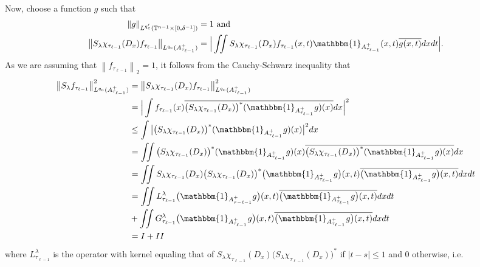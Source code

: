 \documentclass[11pt]{amsart}
\numberwithin{equation}{section}
\newcommand{\Tn}{\mathbb{T}^{n-1}}
\newcommand{\la}{\lambda}
\newcommand\norm[1]{\left\lVert#1\right\rVert}
\newcommand{\lpnorm}[3]{\norm{#1}_{L^{#2}(#3)}}
\newcommand{\lpn}[2]{\norm{#1}_{#2}}
\newcommand{\Sl}{S_{\la}}
\begin{document}
Now, choose a function $g$ such that
\begin{equation} \label{large height duality function}
\begin{split}
        \lpnorm{g}{q_c'}{\Tn \times [0, \delta^{-1}]} &= 1 \ \text{and} \\
        \lpnorm{\Sl \chi_{\tau_{\ell - 1}}(D_x)f_{\tau_{\ell - 1}}}{q_c}{A^{+}_{\tau_{\ell - 1}}} &= \Big|\iint \Sl \chi_{\tau_{\ell - 1}}(D_x) f_{\tau_{\ell - 1}}(x,t)\mathbbm{1}_{A^{+}_{\tau_{\ell - 1}}}(x,t)\overline{ g(x,t)} dx dt\Big|.
\end{split}
\end{equation}
As we are assuming that $\lpn{f_{\tau_{\ell - 1}}}{2} = 1$, it follows from the Cauchy-Schwarz inequality that
\begin{equation}
\begin{split}
\lpnorm{\Sl  f_{\tau_{\ell - 1}}}{q_c}{A^{+}_{\tau_{\ell - 1}}}^2 &= \lpnorm{\Sl \chi_{\tau_{\ell - 1}}(D_x) f_{\tau_{\ell - 1}}}{q_c}{A^{+}_{\tau_{\ell - 1}}}^2 \\ 
    &= \Big|\int f_{\tau_{\ell - 1}}(x)\overline{\big(\Sl \chi_{\tau_{\ell - 1}}(D_x)\big)^* (\mathbbm{1}_{A^{+}_{\tau_{\ell - 1}}}g)(x)} dx \Big|^2 \\
     &\leq \int \big|\big(\Sl \chi_{\tau_{\ell - 1}}(D_x)\big)^* (\mathbbm{1}_{A^{+}_{\tau_{\ell - 1}}}g)(x) \big|^2 dx \\
    &= \iint \big(\Sl \chi_{\tau_{\ell - 1}}(D_x)\big)^* (\mathbbm{1}_{A^{+}_{\tau_{\ell - 1}}}g)(x) \overline{\big(\Sl \chi_{\tau_{\ell - 1}}(D_x)\big)^* (\mathbbm{1}_{A^{+}_{\tau_{\ell - 1}}}g)(x)} dx \\
     &= \iint \Sl \chi_{\tau_{\ell -1}}(D_x) \big( \Sl \chi_{\tau_{\ell - 1}}(D_x)\big)^*\big( \mathbbm{1}_{A^{+}_{\tau_{\ell - 1}}}g\big)(x,t) \overline{\big( \mathbbm{1}_{A^{+}_{\tau_{\ell - 1}}}g\big)(x,t)}dxdt \\
    &=\iint L_{\tau_{\ell - 1}}^{\la}\big( \mathbbm{1}_{A^{+}_{\tau-{\ell - 1}}}g\big)(x,t) \overline{\big( \mathbbm{1}_{A^{+}_{\tau_{\ell - 1}}}g\big)(x,t)}dxdt \\ 
    &+ \iint G_{\tau_{\ell - 1}}^{\la}\big( \mathbbm{1}_{A^{+}_{\tau_{\ell - 1}}}g\big)(x,t) \overline{\big( \mathbbm{1}_{A^{+}_{\tau_{\ell - 1}}}g\big)(x,t)}dxdt \\ 
    &= I + II
\end{split}
\end{equation}
where $L_{\tau_{\ell -1}}^{\la}$ is the operator with kernel equaling that of $\Sl \chi_{\tau_{\ell - 1}}(D_x)\big(\Sl \chi_{\tau_{\ell - 1}}(D_x)\big)^*$ if $|t-s| \leq 1$ and $0$ otherwise, i.e. 
\end{document}

